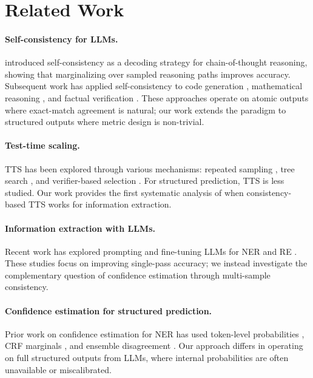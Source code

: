 \documentclass[11pt]{article}
\begin{document}
\section{Related Work}

\paragraph{Self-consistency for LLMs.}
\citet{wang2023selfconsistency} introduced self-consistency as a decoding strategy for chain-of-thought reasoning, showing that marginalizing over sampled reasoning paths improves accuracy.
Subsequent work has applied self-consistency to code generation \citep{chen2023codet}, mathematical reasoning \citep{li2023making}, and factual verification \citep{manakul2023selfcheckgpt}.
These approaches operate on atomic outputs where exact-match agreement is natural; our work extends the paradigm to structured outputs where metric design is non-trivial.

\paragraph{Test-time scaling.}
TTS has been explored through various mechanisms: repeated sampling \citep{brown2024large}, tree search \citep{yao2024tree}, and verifier-based selection \citep{cobbe2021training,lightman2024lets}.
For structured prediction, TTS is less studied.
Our work provides the first systematic analysis of when consistency-based TTS works for information extraction.

\paragraph{Information extraction with LLMs.}
Recent work has explored prompting and fine-tuning LLMs for NER \citep{wang2023gptner,li2024llmner} and RE \citep{wadhwa2023revisiting,xu2024large}.
These studies focus on improving single-pass accuracy; we instead investigate the complementary question of confidence estimation through multi-sample consistency.

\paragraph{Confidence estimation for structured prediction.}
Prior work on confidence estimation for NER has used token-level probabilities \citep{culotta2004confidence}, CRF marginals \citep{lafferty2001conditional}, and ensemble disagreement \citep{shelmanov2021certain}.
Our approach differs in operating on full structured outputs from LLMs, where internal probabilities are often unavailable or miscalibrated.
\end{document}
